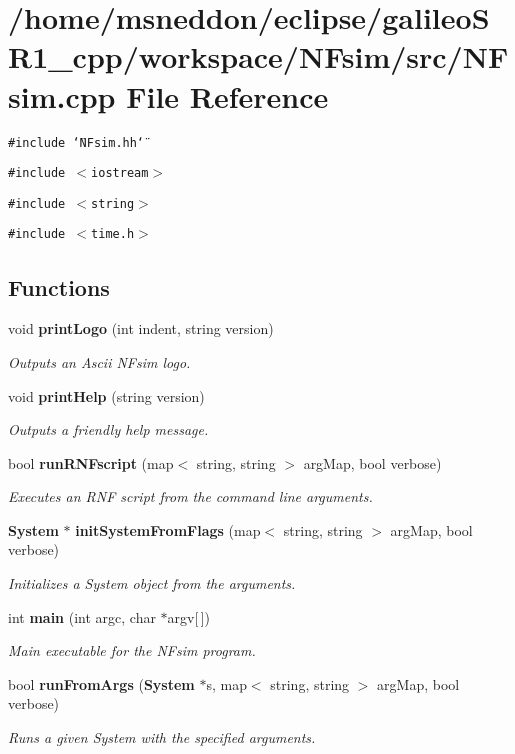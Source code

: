 \section{/home/msneddon/eclipse/galileoSR1\_\-cpp/workspace/NFsim/src/NFsim.cpp File Reference}
\label{NFsim_8cpp}


{\tt \#include \char`\"{}NFsim.hh\char`\"{}}\par
{\tt \#include $<$iostream$>$}\par
{\tt \#include $<$string$>$}\par
{\tt \#include $<$time.h$>$}\par
\subsection*{Functions}
\begin{CompactItemize}
\item 
void {\bf printLogo} (int indent, string version)
\begin{CompactList}\small\item\em Outputs an Ascii NFsim logo. \item\end{CompactList}\item 
void {\bf printHelp} (string version)
\begin{CompactList}\small\item\em Outputs a friendly help message. \item\end{CompactList}\item 
bool {\bf runRNFscript} (map$<$ string, string $>$ argMap, bool verbose)
\begin{CompactList}\small\item\em Executes an RNF script from the command line arguments. \item\end{CompactList}\item 
{\bf System} $\ast$ {\bf initSystemFromFlags} (map$<$ string, string $>$ argMap, bool verbose)
\begin{CompactList}\small\item\em Initializes a System object from the arguments. \item\end{CompactList}\item 
int {\bf main} (int argc, char $\ast$argv[$\,$])
\begin{CompactList}\small\item\em Main executable for the NFsim program. \item\end{CompactList}\item 
bool {\bf runFromArgs} ({\bf System} $\ast$s, map$<$ string, string $>$ argMap, bool verbose)
\begin{CompactList}\small\item\em Runs a given System with the specified arguments. \item\end{CompactList}\end{CompactItemize}


